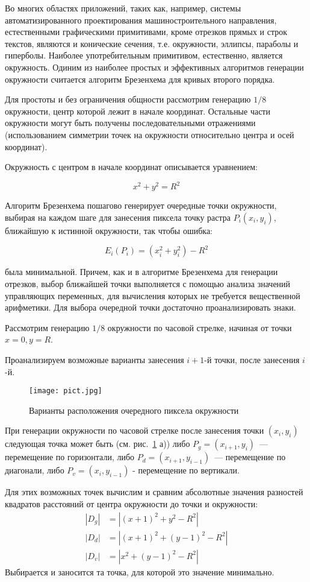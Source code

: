 Во многих областях приложений, таких как, например, системы автоматизированного проектирования машиностроительного направления, естественными графическими примитивами, кроме отрезков прямых и строк текстов, являются и конические сечения, т.е. окружности, эллипсы, параболы и гиперболы. Наиболее употребительным примитивом, естественно, является окружность. Одиним из наиболее простых и эффективных алгоритмов генерации окружности считается алгоритм Брезенхема для кривых второго порядка.

Для простоты и без ограничения общности рассмотрим генерацию $1/8$ окружности, центр которой лежит в начале координат. Остальные части окружности могут быть получены последовательными отражениями (использованием симметрии точек на окружности относительно центра и осей координат).

Окружность с центром в начале координат описывается уравнением:

$$x^2 + y^2 = R^2$$

Алгоритм Брезенхема пошагово генерирует очередные точки окружности, выбирая на каждом шаге для занесения пиксела точку растра $P_i(x_i,  y_i)$, ближайшую к истинной окружности, так чтобы ошибка:

$$E_i(P_i)    =   (x_i^2   +   y_i^2)   -   R^2$$

была минимальной. Причем, как и в алгоритме Брезенхема для генерации отрезков, выбор ближайшей точки выполняется с помощью анализа значений управляющих переменных, для вычисления которых не требуется вещественной арифметики. Для выбора очередной точки достаточно проанализировать знаки.

Рассмотрим генерацию $1/8$ окружности по часовой стрелке, начиная от точки $x=0, y=R$.

Проанализируем возможные варианты занесения $i+1$-й точки, после занесения $i$-й. 

\begin{figure}[h]
	\centering
	\texttt{[image: pict.jpg]}
	\caption{Варианты расположения очередного пиксела окружности}
	\label{pic}
\end{figure}

При генерации окружности по часовой стрелке после занесения точки $(x_i, y_i)$ следующая точка может быть (см. рис.~\ref{pic} а)) либо $P_g = (x_{i+1}, y_i)$~--- перемещение по горизонтали, либо $P_d = (x_{i+1}, y_{i-1})$~--- перемещение по диагонали, либо $P_v = (x_i, y_{i-1})$ - перемещение по вертикали.

Для этих возможных точек вычислим и сравним абсолютные значения разностей квадратов расстояний от центра окружности до точки и окружности: 
\begin{align*}
	|D_g|&=|(x+1)^2+y^2-R^2| \\
	|D_d|&=|(x+1)^2+(y-1)^2-R^2| \\
	|D_v|&=|x^2+(y-1)^2-R^2|
\end{align*}
Выбирается и заносится та точка, для которой это значение минимально.

